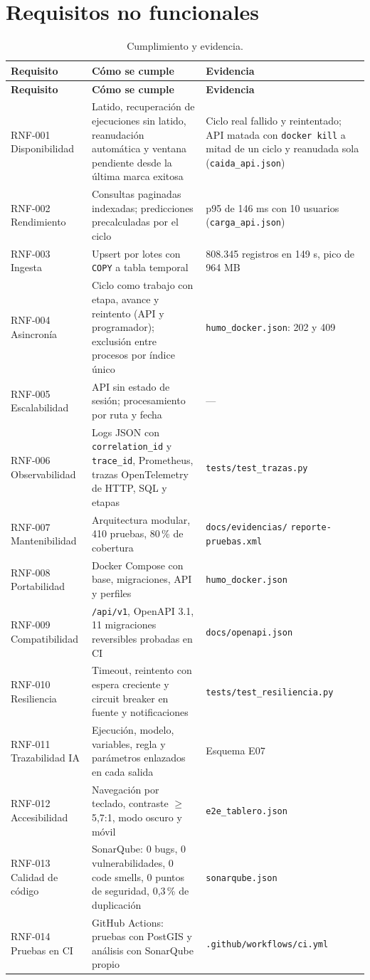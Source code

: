\documentclass[10pt,a4paper]{article}
\newcommand{\cod}[1]{\texttt{\small #1}}
\begin{document}
\section{Requisitos no funcionales}

\begin{longtable}{@{}p{}p{}p{}@{}}
\caption{Cumplimiento y evidencia.}\\
\toprule
\textbf{Requisito} & \textbf{Cómo se cumple} & \textbf{Evidencia} \\
\midrule
\endfirsthead
\toprule
\textbf{Requisito} & \textbf{Cómo se cumple} & \textbf{Evidencia} \\
\midrule
\endhead
RNF-001 Disponibilidad & Latido, recuperación de ejecuciones sin latido, reanudación automática y ventana pendiente desde la última marca exitosa & Ciclo real fallido y reintentado; API matada con \cod{docker kill} a mitad de un ciclo y reanudada sola (\cod{caida\_api.json}) \\
RNF-002 Rendimiento & Consultas paginadas indexadas; predicciones precalculadas por el ciclo & p95 de 146 ms con 10 usuarios (\cod{carga\_api.json}) \\
RNF-003 Ingesta & Upsert por lotes con \cod{COPY} a tabla temporal & 808.345 registros en 149 s, pico de 964 MB \\
RNF-004 Asincronía & Ciclo como trabajo con etapa, avance y reintento (API y programador); exclusión entre procesos por índice único & \cod{humo\_docker.json}: 202 y 409 \\
RNF-005 Escalabilidad & API sin estado de sesión; procesamiento por ruta y fecha & --- \\
RNF-006 Observabilidad & Logs JSON con \cod{correlation\_id} y \cod{trace\_id}, Prometheus, trazas OpenTelemetry de HTTP, SQL y etapas & \cod{tests/test\_trazas.py} \\
RNF-007 Mantenibilidad & Arquitectura modular, 410 pruebas, 80\,\% de cobertura & \cod{docs/evidencias/} \cod{reporte-pruebas.xml} \\
RNF-008 Portabilidad & Docker Compose con base, migraciones, API y perfiles & \cod{humo\_docker.json} \\
RNF-009 Compatibilidad & \cod{/api/v1}, OpenAPI 3.1, 11 migraciones reversibles probadas en CI & \cod{docs/openapi.json} \\
RNF-010 Resiliencia & Timeout, reintento con espera creciente y circuit breaker en fuente y notificaciones & \cod{tests/test\_resiliencia.py} \\
RNF-011 Trazabilidad IA & Ejecución, modelo, variables, regla y parámetros enlazados en cada salida & Esquema E07 \\
RNF-012 Accesibilidad & Navegación por teclado, contraste $\ge$ 5,7:1, modo oscuro y móvil & \cod{e2e\_tablero.json} \\
RNF-013 Calidad de código & SonarQube: 0 bugs, 0 vulnerabilidades, 0 code smells, 0 puntos de seguridad, 0,3\,\% de duplicación & \cod{sonarqube.json} \\
RNF-014 Pruebas en CI & GitHub Actions: pruebas con PostGIS y análisis con SonarQube propio & \cod{.github/workflows/ci.yml} \\
\bottomrule
\end{longtable}
\end{document}
